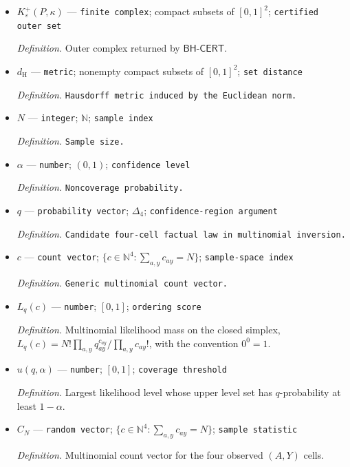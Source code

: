 \documentclass{article}
\begin{document}
\begin{itemize}
  \par\smallskip\noindent\emph{Definition.} Inner complex returned by \(\mathsf{BH\mbox{-}CERT}\).
  \item \(K^+_\varepsilon(P,\kappa)\) --- \texttt{finite complex}; compact subsets of \([0,1]^2\); \texttt{certified outer set}
  \par\smallskip\noindent\emph{Definition.} Outer complex returned by \(\mathsf{BH\mbox{-}CERT}\).
  \item \(d_{\mathrm H}\) --- \texttt{metric}; nonempty compact subsets of \([0,1]^2\); \texttt{set distance}
  \par\smallskip\noindent\emph{Definition.} \texttt{Hausdorff metric induced by the Euclidean norm.}
  \item \(N\) --- \texttt{integer}; \(\mathbb N\); \texttt{sample index}
  \par\smallskip\noindent\emph{Definition.} \texttt{Sample size.}
  \item \(\alpha\) --- \texttt{number}; \((0,1)\); \texttt{confidence level}
  \par\smallskip\noindent\emph{Definition.} \texttt{Noncoverage probability.}
  \item \(q\) --- \texttt{probability vector}; \(\Delta_4\); \texttt{confidence-\allowbreak{}region argument}
  \par\smallskip\noindent\emph{Definition.} \texttt{Candidate four-\allowbreak{}cell factual law in multinomial inversion.}
  \item \(c\) --- \texttt{count vector}; \(\{c\in\mathbb N^4:\sum_{a,y}c_{ay}=N\}\); \texttt{sample-\allowbreak{}space index}
  \par\smallskip\noindent\emph{Definition.} \texttt{Generic multinomial count vector.}
  \item \(L_q(c)\) --- \texttt{number}; \([0,1]\); \texttt{ordering score}
  \par\smallskip\noindent\emph{Definition.} Multinomial likelihood mass on the closed simplex, \(L_q(c)=N!\prod_{a,y}q_{ay}^{c_{ay}}/\prod_{a,y}c_{ay}!\), with the convention \(0^0=1\).
  \item \(u(q,\alpha)\) --- \texttt{number}; \([0,1]\); \texttt{coverage threshold}
  \par\smallskip\noindent\emph{Definition.} Largest likelihood level whose upper level set has \(q\)-probability at least \(1-\alpha\).
  \item \(C_N\) --- \texttt{random vector}; \(\{c\in\mathbb N^4:\sum_{a,y}c_{ay}=N\}\); \texttt{sample statistic}
  \par\smallskip\noindent\emph{Definition.} Multinomial count vector for the four observed \((A,Y)\) cells.

\end{itemize}
\end{document}
